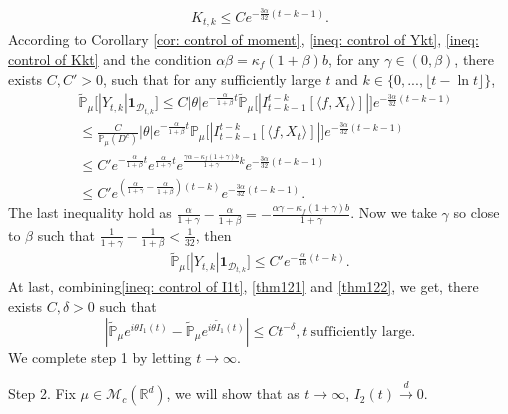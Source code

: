 \documentclass[12pt,oneside,english]{amsart}
\theoremstyle{plain}
\theoremstyle{definition}
\numberwithin{equation}{section}
\begin{document}
\begin{align}\label{ineq: control of Kkt}
     K_{t,k}\leq C e^{-\frac{3\alpha}{32}(t-k-1)}.
\end{align}
 According to Corollary \ref{cor: control of moment}, \eqref{ineq: control of Ykt}, \eqref{ineq: control of Kkt} and the condition $\alpha\beta=\kappa_f(1+\beta)b$, for any $\gamma\in (0, \beta)$, there exists $C,C'>0$, such that for any  sufficiently large  $t$ and $k\in \{0,...,\lfloor t-\ln t\rfloor\}$,
\begin{align}
    &\mathbb{\tilde{P}}_{\mu}\big[|Y_{t,k}|\mathbf{1}_{\mathcal{D}_{t,k}}\big]
    \leq C|\theta|e^{-\frac{\alpha}{1+\beta}t}\mathbb{\tilde{P}}_{\mu}\big[|I_{t-k-1}^{t-k}[\langle f,X_t\rangle]|\big]e^{-\frac{3\alpha}{32}(t-k-1)}
    \\&\leq \frac{C}{\mathbb{P}_{\mu}(D^c)}|\theta|e^{-\frac{\alpha}{1+\beta}t}\mathbb{P}_{\mu}\big[|I_{t-k-1}^{t-k}[\langle f,X_t\rangle]|\big]e^{-\frac{3\alpha}{32}(t-k-1)}
    \\&\leq C' e^{-\frac{\alpha}{1+\beta}t}e^{\frac{\alpha}{1+\gamma}t}e^{\frac{\gamma \alpha-\kappa_f(1+\gamma)b}{1+\gamma}k}e^{-\frac{3\alpha}{32}(t-k-1)}\label{thm125}\\
    &\leq C' e^{(\frac{\alpha}{1+\gamma}-\frac{\alpha}{1+\beta})(t-k)}e^{-\frac{3\alpha}{32}(t-k-1)}.\nonumber
\end{align}
The last inequality hold as $\frac{\alpha}{1+\gamma}-\frac{\alpha}{1+\beta}=-\frac{\alpha \gamma-\kappa
_f(1+\gamma)b}{1+\gamma}$.
Now we take $\gamma$ so close to $\beta$ such that $\frac{1}{1+\gamma}-\frac{1}{1+\beta}<\frac{1}{32}$, then
\begin{align}
     \mathbb{\tilde{P}}_{\mu}\big[|Y_{t,k}|\mathbf{1}_{\mathcal{D}_{t,k}}\big]\leq  C' e^{-\frac{\alpha}{16}(t-k)}.\label{thm122}
\end{align}
At last, combining\eqref{ineq: control of I1t}, \eqref{thm121} and \eqref{thm122}, we get, there exists $C,\delta>0$ such that 
$$\left|\mathbb{\tilde{P}}_{\mu}e^{i\theta I_1(t)}-\mathbb{\tilde{P}}_{\mu}e^{i\theta\tilde{I}_1(t)}\right|\leq C t^{-\delta}, t ~\text{sufficiently large}.$$
We complete step 1 by letting $t\rightarrow \infty$.

Step 2. Fix $\mu \in \mathcal{M}_c(\mathbb{R}^d)$, we will show that as $t\rightarrow \infty$, $I_2(t) \xrightarrow{d} 0$.
\end{document}

